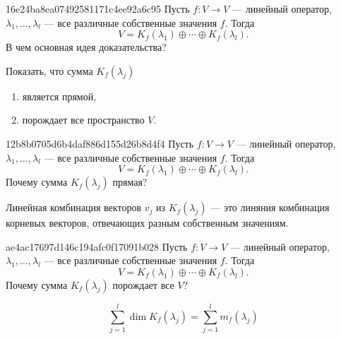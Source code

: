 \begin{note}{16e24ba8ea07492581171c4ee92a6c95}
    Пусть \( f : V \to V \) --- линейный оператор, \( \lambda_1, \ldots, \lambda_l \) --- все различные собственные значения \( f \).
    Тогда
    \[
        V = K_f (\lambda_1) \oplus \cdots \oplus K_f (\lambda_l).
    \]
    В чем основная идея доказательства?

    \begin{cloze}{1}
        Показать, что сумма \( K_f(\lambda_j) \)
        \begin{enumerate}
            \item является прямой,
            \item порождает все пространство \( V \).
        \end{enumerate}
    \end{cloze}
\end{note}

\begin{note}{12b8b0705d6b4daf886d155d26b8d4f4}
    Пусть \( f : V \to V \) --- линейный оператор, \( \lambda_1, \ldots, \lambda_l \) --- все различные собственные значения \( f \).
    Тогда
    \[
        V = K_f (\lambda_1) \oplus \cdots \oplus K_f (\lambda_l).
    \]
    Почему сумма \( K_f(\lambda_j) \) прямая?

    \begin{cloze}{1}
        Линейная комбинация векторов \( v_j \) из \( K_f (\lambda_j) \) --- это линяния комбинация корневых векторов, отвечающих разным собственным значениям.
    \end{cloze}
\end{note}

\begin{note}{ae4ac17697d146c194afc0f17091b028}
    Пусть \( f : V \to V \) --- линейный оператор, \( \lambda_1, \ldots, \lambda_l \) --- все различные собственные значения \( f \).
    Тогда
    \[
        V = K_f (\lambda_1) \oplus \cdots \oplus K_f (\lambda_l).
    \]
    Почему сумма \( K_f(\lambda_j) \) порождает все \( V \)?

    \begin{cloze}{1}
        \[
            \sum_{j=1}^{l} \dim K_f(\lambda_j) = \sum_{j=1}^{l} m_f(\lambda_j)
        \]
    \end{cloze}
\end{note}

